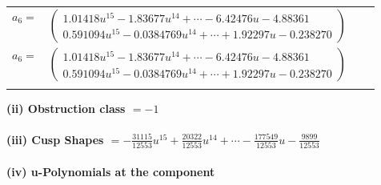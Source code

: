 \documentclass[1p]{elsarticle_modified}
\theoremstyle{definition}
\begin{document}
\begin{tabular}{m{7pt} m{180pt} m{7pt} m{180pt} }
\flushright $a_{6}=$&$\begin{pmatrix}1.01418 u^{15}-1.83677 u^{14}+\cdots-6.42476 u-4.88361\\0.591094 u^{15}-0.0384769 u^{14}+\cdots+1.92297 u-0.238270\end{pmatrix}$\\ \flushright $a_{6}=$&$\begin{pmatrix}1.01418 u^{15}-1.83677 u^{14}+\cdots-6.42476 u-4.88361\\0.591094 u^{15}-0.0384769 u^{14}+\cdots+1.92297 u-0.238270\end{pmatrix}$\\&\end{tabular}
\flushleft \textbf{(ii) Obstruction class $= -1$}\\~\\
\flushleft \textbf{(iii) Cusp Shapes $= -\frac{31115}{12553} u^{15}+\frac{20322}{12553} u^{14}+\cdots-\frac{177549}{12553} u-\frac{9899}{12553}$}\\~\\
\newpage\renewcommand{\arraystretch}{1}
\flushleft \textbf{(iv) u-Polynomials at the component}\newline \\
\end{document}
